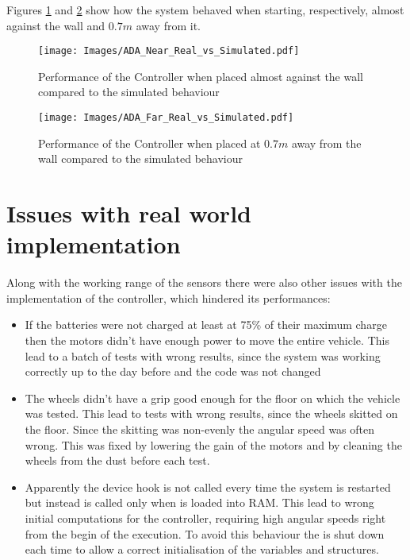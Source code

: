   Figures \ref{img:LiberaMeNear} and \ref{img:LiberaMeFar} show how the
  system behaved when starting, respectively, almost against the wall and
  $0.7 m$ away from it.

  \begin{figure}[h!]
    \centering
    \texttt{[image: Images/ADA\_Near\_Real\_vs\_Simulated.pdf]}
    \caption{Performance of the Controller when placed almost against the
      wall compared to the simulated behaviour\label{img:LiberaMeNear}}
  \end{figure}

  \begin{figure}[h!]
    \centering
    \texttt{[image: Images/ADA\_Far\_Real\_vs\_Simulated.pdf]}
    \caption{Performance of the Controller when placed at $0.7 m$ away from
      the wall compared to the simulated behaviour\label{img:LiberaMeFar}}
  \end{figure}

\section{Issues with real world implementation}

  Along with the working range of the sensors there were also other issues
  with the implementation of the controller, which hindered its
  performances:

  \begin{itemize}
    \item{} If the batteries were not charged at least at 75\% of their
      maximum charge then the motors didn't have enough power to move the
      entire vehicle. This lead to a batch of tests with wrong results,
      since the system was working correctly up to the day before and the
      code was not changed
    \item{} The wheels didn't have a grip good enough for the floor on
      which the vehicle was tested. This lead to tests with wrong results,
      since the wheels skitted on the floor. Since the skitting was
      non-evenly the angular speed was often wrong. This was fixed by
      lowering the gain of the motors and by cleaning the wheels from the
      dust before each test.
    \item{} Apparently the device hook 
      is not called every time the system is restarted but instead is
      called only when \nxtOSEK{} is loaded into RAM. This lead to wrong
      initial computations for the controller, requiring high angular
      speeds right from the begin of the execution. To avoid this behaviour
      the \nxt{} is shut down each time to allow a correct initialisation
      of the variables and structures.
  \end{itemize}

